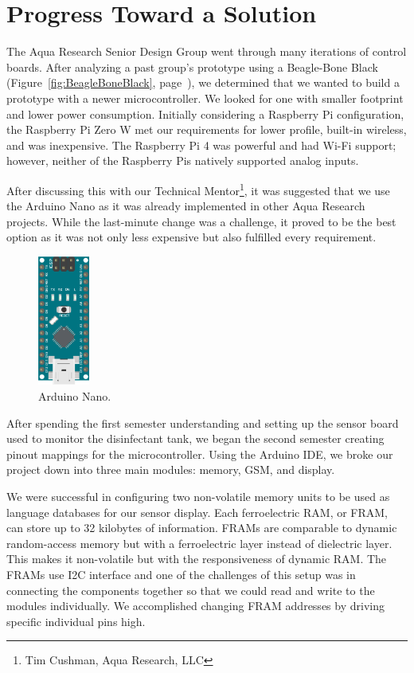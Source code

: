 \documentclass[12pt]{article}
\begin{document}
\section{Progress Toward a Solution}
The Aqua Research Senior Design Group went through many iterations of control boards. After analyzing a past group’s prototype using a Beagle-Bone Black (Figure~\ref{fig:BeagleBoneBlack}, page~\pageref{fig:BeagleBoneBlack}), we determined that we wanted to build a prototype with a newer microcontroller. We looked for one with smaller footprint and lower power consumption. Initially considering a Raspberry Pi configuration, the Raspberry Pi Zero W met our requirements for lower profile, built-in wireless, and was inexpensive. The Raspberry Pi 4 was powerful and had Wi-Fi support; however, neither of the Raspberry Pis natively supported analog inputs.

\noindent After discussing this with our Technical Mentor\footnote{Tim Cushman, Aqua Research, LLC}, it was suggested that we use the Arduino Nano as it was already implemented in other Aqua Research projects. While the last-minute change was a challenge, it proved to be the best option as it was not only less expensive but also fulfilled every requirement.
\begin{figure}[h!]
    \centering
    \includegraphics[width=0.15\textwidth, angle=270]{nano.png}
    \caption{Arduino Nano.}
    \label{fig:ArduinoNano}
\end{figure}

\noindent After spending the first semester understanding and setting up the sensor board used to monitor the disinfectant tank, we began the second semester creating pinout mappings for the microcontroller. Using the Arduino IDE, we broke our project down into three main modules: memory, GSM, and display.

\noindent We were successful in configuring two non-volatile memory units to be used as language databases for our sensor display. Each ferroelectric RAM, or FRAM, can store up to 32 kilobytes of information. FRAMs are comparable to dynamic random-access memory but with a ferroelectric layer instead of dielectric layer. This makes it non-volatile but with the responsiveness of dynamic RAM. The FRAMs use I2C interface and one of the challenges of this setup was in connecting the components together so that we could read and write to the modules individually. We accomplished changing FRAM addresses by driving specific individual pins high.
\end{document}
